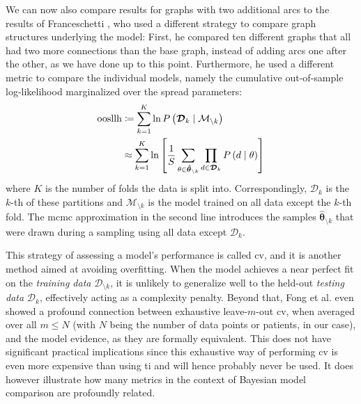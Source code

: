 \documentclass[\relativeRoot/main.tex]{subfiles}
\begin{document}
We can now also compare results for graphs with two additional arcs to the results of Franceschetti \cite{franceschetti_comparison_2022}, who used a different strategy to compare graph structures underlying the model: First, he compared ten different graphs that all had two more connections than the base graph, instead of adding arcs one after the other, as we have done up to this point. Furthermore, he used a different metric to compare the individual models, namely the cumulative out-of-sample log-likelihood marginalized over the spread parameters:
%
\begin{equation} \label{eq:cross_validation}
    \begin{aligned}
        \text{oosllh} &\coloneqq \sum_{k=1}^K{\ln{ P \left( \boldsymbol{\mathcal{D}}_k \mid \mathcal{M}_{\setminus k} \right) }} \\
        &\approx \sum_{k=1}^K{\ln{ \left[ \frac{1}{S} \sum_{\theta \in \boldsymbol{\hat{\theta}}_{\setminus k}}{ \prod_{d \in \boldsymbol{\mathcal{D}}_k}{ P \left( d \mid \theta \right) } } \right] }}
    \end{aligned}
\end{equation}
%
where $K$ is the number of folds the data is split into. Correspondingly, $\boldsymbol{\mathcal{D}}_k$ is the $k$-th of these partitions and $\mathcal{M}_{\setminus k}$ is the model trained on all data except the $k$-th fold. The \gls{mcmc} approximation in the second line introduces the samples $\boldsymbol{\hat{\theta}}_{\setminus k}$ that were drawn during a sampling using all data except $\boldsymbol{\mathcal{D}}_k$.

This strategy of assessing a model's performance is called \gls{cv}, and it is another method aimed at avoiding overfitting. When the model achieves a near perfect fit on the \emph{training data} $\boldsymbol{\mathcal{D}}_{\setminus k}$, it is unlikely to generalize well to the held-out \emph{testing data} $\boldsymbol{\mathcal{D}}_k$, effectively acting as a complexity penalty. Beyond that, Fong et al. \cite{fong_marginal_2019} even showed a profound connection between exhaustive leave-$m$-out \gls{cv}, when averaged over all $m \leq N$ (with $N$ being the number of data points or patients, in our case), and the model evidence, as they are formally equivalent. This does not have significant practical implications since this exhaustive way of performing \gls{cv} is even more expensive than using \acrlong{ti} and will hence probably never be used. It does however illustrate how many metrics in the context of Bayesian model comparison are profoundly related.
\end{document}
